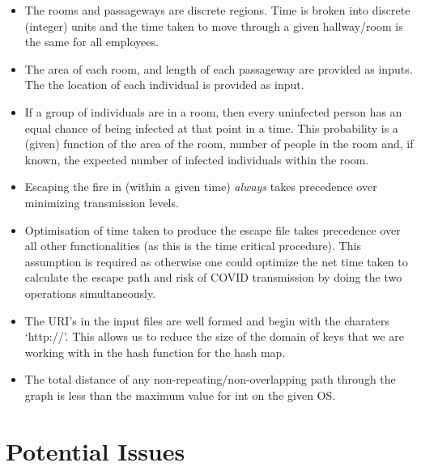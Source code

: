 \documentclass{article}
\begin{document}
\begin{itemize}[noitemsep]
    \item {
        The rooms and passageways are discrete regions. Time is broken into discrete (integer) units and the time taken to move through a given hallway/room is the same for all employees.
    }
    
    \item {
        The area of each room, and length of each passageway are provided as inputs. The the location of each individual is provided as input.
    }
    
    \item {
        If a group of individuals are in a room, then every uninfected person has an equal chance of being infected at that point in a time. This probability is a (given) function of the area of the room, number of people in the room and, if known, the expected number of infected individuals within the room.
    }
    
    \item {
        Escaping the fire in (within a given time) \textit{always} takes precedence over minimizing transmission levels.
    }
    
    \item {
        Optimisation of time taken to produce the escape file takes precedence over all other functionalities (as this is the time critical procedure). This assumption is required as otherwise one could optimize the net time taken to calculate the escape path and risk of COVID transmission by doing the two operations simultaneously.
    }
    
    \item {
        The URI's in the input files are well formed and begin with the charaters `http://'. This allows us to reduce the size of the domain of keys that we are working with in the hash function for the hash map.
    }
    
    \item {
        The total distance of any non-repeating/non-overlapping path through the graph is less than the maximum value for int on the given OS.
    }
    
\end{itemize}

\section{Potential Issues}
\end{document}
